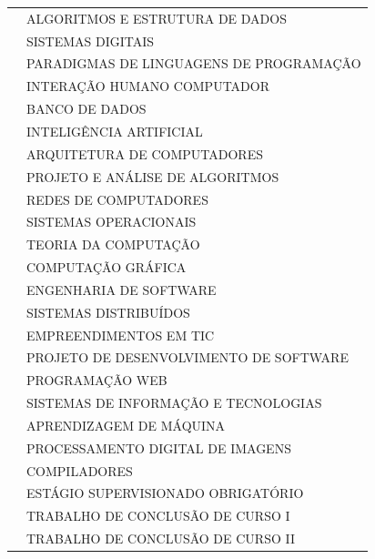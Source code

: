 \begin{center}
\begin{scriptsize}
\begin{longtable}{@{}lp{10cm}}
                            & ALGORITMOS E ESTRUTURA DE DADOS \\
                            & SISTEMAS DIGITAIS \\
                            & PARADIGMAS DE LINGUAGENS DE PROGRAMAÇÃO \\
                            & INTERAÇÃO HUMANO COMPUTADOR \\
                            & BANCO DE DADOS \\
                            & INTELIGÊNCIA ARTIFICIAL \\
                            & ARQUITETURA DE COMPUTADORES \\
                            & PROJETO E ANÁLISE DE ALGORITMOS \\
                            & REDES DE COMPUTADORES \\
                            & SISTEMAS OPERACIONAIS \\
                            & TEORIA DA COMPUTAÇÃO \\
                            & COMPUTAÇÃO GRÁFICA \\
                            & ENGENHARIA DE SOFTWARE \\
                            & SISTEMAS DISTRIBUÍDOS \\
                            & EMPREENDIMENTOS EM TIC \\
                            & PROJETO DE DESENVOLVIMENTO DE SOFTWARE \\
                            & PROGRAMAÇÃO WEB \\
                            & SISTEMAS DE INFORMAÇÃO E TECNOLOGIAS \\
                            & APRENDIZAGEM DE MÁQUINA \\
                            & PROCESSAMENTO DIGITAL DE IMAGENS \\
                            & COMPILADORES \\
                            & ESTÁGIO SUPERVISIONADO OBRIGATÓRIO \\
                            & TRABALHO DE CONCLUSÃO DE CURSO I \\
                            & TRABALHO DE CONCLUSÃO DE CURSO II \\
    \bottomrule
    \end{longtable}
  \end{scriptsize}      
\end{center}


